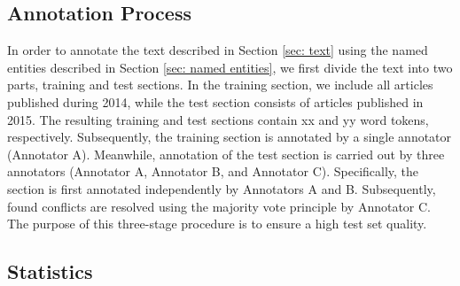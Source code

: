 \documentclass[11pt]{article}
\begin{document}






\subsection{Annotation Process}

In order to annotate the text described in Section \ref{sec: text} using the named entities described in Section \ref{sec: named entities}, we first divide the text into two parts, training and test sections. In the training section, we include all articles published during 2014, while the test section consists of articles published in 2015. The resulting training and test sections contain xx and yy word tokens, respectively. Subsequently, the training section is annotated by a single annotator (Annotator A). Meanwhile, annotation of the test section is carried out by three annotators (Annotator A, Annotator B, and Annotator C). Specifically, the section is first annotated independently by Annotators A and B. Subsequently, found conflicts are resolved using the majority vote principle by Annotator C. The purpose of this three-stage procedure is to ensure a high test set quality.



\subsection{Statistics}
\end{document}

